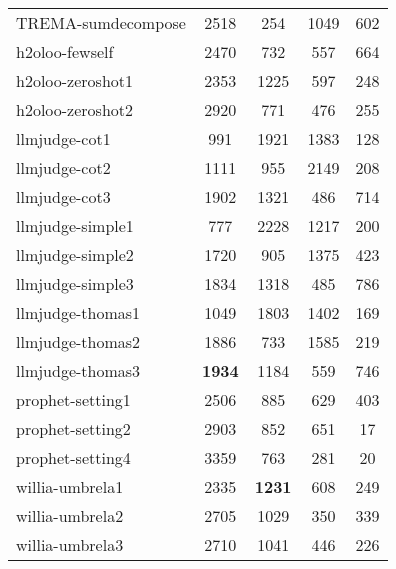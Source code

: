 \begin{table}[ht]
{\begin{tabular}{lcccc}
    TREMA-sumdecompose & 2518 & 254 & 1049 & 602 \\
    h2oloo-fewself & 2470 & 732 & 557 & 664 \\
    h2oloo-zeroshot1 & 2353 & 1225 & 597 & 248 \\
    h2oloo-zeroshot2 & 2920 & 771 & 476 & 255 \\
    llmjudge-cot1 & 991 & 1921 & 1383 & 128 \\
    llmjudge-cot2 & 1111 & 955 & 2149 & 208 \\
    llmjudge-cot3 & 1902 & 1321 & 486 & 714 \\
    llmjudge-simple1 & 777 & 2228 & 1217 & 200 \\
    llmjudge-simple2 & 1720 & 905 & 1375 & 423 \\
    llmjudge-simple3 & 1834 & 1318 & 485 & 786 \\
    llmjudge-thomas1 & 1049 & 1803 & 1402 & 169 \\
    llmjudge-thomas2 & 1886 & 733 & 1585 & 219 \\
    llmjudge-thomas3 & \textbf{1934} & 1184 & 559 & 746 \\
    prophet-setting1 & 2506 & 885 & 629 & 403 \\
    prophet-setting2 & 2903 & 852 & 651 & 17 \\
    prophet-setting4 & 3359 & 763 & 281 & 20 \\
    willia-umbrela1 & 2335 & \textbf{1231} & 608 & 249 \\
    willia-umbrela2 & 2705 & 1029 & 350 & 339 \\
    willia-umbrela3 & 2710 & 1041 & 446 & 226 \\
    \bottomrule
    \end{tabular}
    }
    \label{tab:labels}
\end{table}
